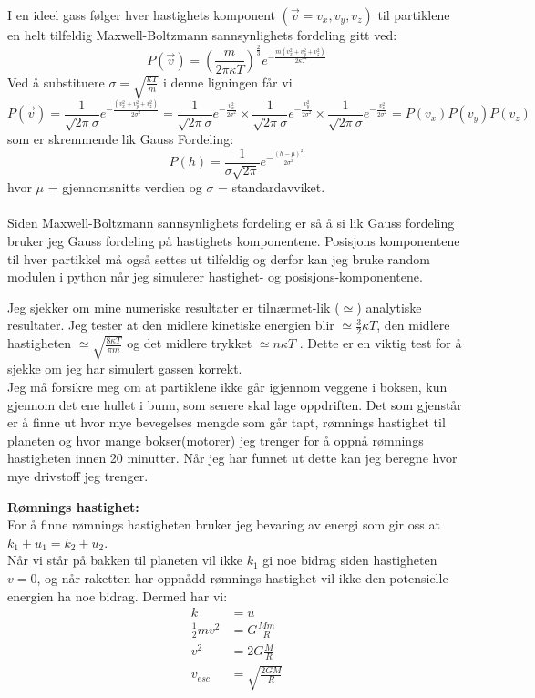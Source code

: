 \documentclass[12pt,preprint]{aastex6}
\begin{document}
I en ideel gass følger hver hastighets komponent $(\vec{v}=v_x,v_y,v_z)$ til partiklene en helt tilfeldig Maxwell-Boltzmann sannsynlighets fordeling gitt ved:
\[
P(\vec{v}) = \left(\frac{m}{2 \pi \kappa T} \right)^{\frac{2}{3}} e^{-\frac{m(v_x^2+v_y^2+v_z^2)}{2\kappa T}}
\]
Ved å substituere $\sigma = \sqrt{\frac{\kappa T}{m}}$ i denne ligningen får vi
\[
P(\vec{v}) = \frac{1}{\sqrt{2 \pi}\sigma}  e^{-\frac{(v_x^2+v_y^2+v_z^2)}{2\sigma^2}} = 
\frac{1}{\sqrt{2 \pi}\sigma}  e^{-\frac{v_x^2}{2\sigma^2}}\times 
\frac{1}{\sqrt{2 \pi}\sigma}  e^{-\frac{v_y^2}{2\sigma^2}}\times 
\frac{1}{\sqrt{2 \pi}\sigma}  e^{-\frac{v_z^2}{2\sigma^2}} = P(v_x)P(v_y)P(v_z)
\]
som er skremmende lik Gauss Fordeling:
\[
P(h) = \frac{1}{\sigma \sqrt{2 \pi}}  e^{-\frac{(h- \mu)^2}{2\sigma^2}}
\]
hvor $\mu$ = gjennomsnitts verdien og $\sigma$ = standardavviket.\\
\\
Siden Maxwell-Boltzmann sannsynlighets fordeling er så å si lik Gauss fordeling bruker jeg Gauss fordeling på hastighets komponentene. Posisjons komponentene til hver partikkel må også settes ut tilfeldig og derfor kan jeg bruke random modulen i python når jeg simulerer hastighet- og posisjons-komponentene.

Jeg sjekker om mine numeriske resultater er tilnærmet-lik ($\simeq$) analytiske resultater. Jeg tester at den midlere kinetiske energien blir $\simeq \frac{3}{2}\kappa T$, den midlere hastigheten $\simeq \sqrt{\frac{8\kappa T}{\pi m}}$ og det midlere trykket $\simeq n\kappa T$ . Dette er en viktig test for å sjekke om jeg har simulert gassen korrekt.
\\

Jeg må forsikre meg om at partiklene ikke går igjennom veggene i boksen, kun gjennom det ene hullet i bunn, som senere skal lage oppdriften.
Det som gjenstår er å finne ut hvor mye bevegelses mengde som går tapt, rømnings hastighet til planeten og hvor mange bokser(motorer) jeg trenger for å oppnå rømnings hastigheten innen 20 minutter. Når jeg har funnet ut dette kan jeg beregne hvor mye drivstoff jeg trenger.
\newpage

\textbf{Rømnings hastighet:}\\
For å finne rømnings hastigheten bruker jeg bevaring av energi som gir oss at $k_1+u_1=k_2+u_2$.\\ Når vi står på bakken til planeten vil ikke $k_1$ gi noe bidrag siden hastigheten $v=0$, og når raketten har oppnådd rømnings hastighet vil ikke den potensielle energien ha noe bidrag. 
Dermed har vi:
\begin{align*}
k &= u \\ 
\frac{1}{2}mv^2& = G\frac{Mm}{R}\\
v^2 &=2 G\frac{M}{R}\\
v_{esc} &= \sqrt{\frac{2GM}{R}}
\end{align*}
\end{document}
